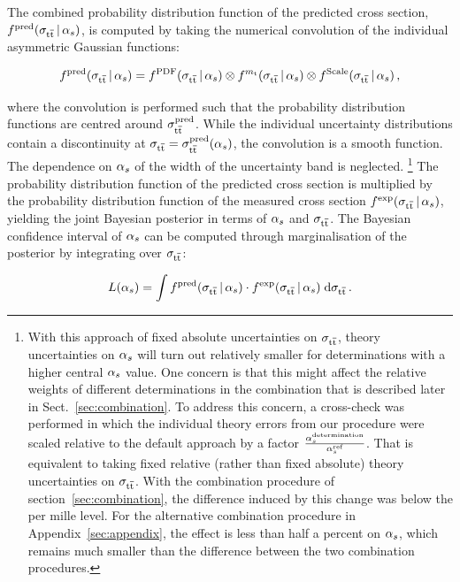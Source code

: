 The combined probability distribution function of the predicted cross
section, $f^{\text{pred}}(\sigma_{\mathrm{t}\overline{\mathrm{t}}}\,|\,\alpha_s)$, is computed by taking the
numerical convolution of the individual asymmetric Gaussian functions:
% 
\begin{linenomath*}
\begin{equation}
f^{\text{pred}}(\sigma_{\mathrm{t}\overline{\mathrm{t}}}\,|\,\alpha_s) = 
    f^{\text{PDF}}(\sigma_{\mathrm{t}\overline{\mathrm{t}}}\,|\,\alpha_s)    \otimes
    f^{m_{\mathrm{t}}}(\sigma_{\mathrm{t}\overline{\mathrm{t}}}\,|\,\alpha_s)           \otimes
    f^{\text{Scale}}(\sigma_{\mathrm{t}\overline{\mathrm{t}}}\,|\,\alpha_s)\,,
\end{equation}
\end{linenomath*}
% 
where the convolution is performed such that the probability distribution
functions are centred around $\sigma_{\mathrm{t}\overline{\mathrm{t}}}^\text{pred}$.
%
While the individual uncertainty distributions contain a discontinuity
at $\sigma_{\mathrm{t}\overline{\mathrm{t}}} = \sigma_{\mathrm{t}\overline{\mathrm{t}}}^{\text{pred}}(\alpha_s)$, the convolution is a smooth
function.
%
The dependence on $\alpha_s$ of the width of the uncertainty band is neglected.%
% 
\footnote{ With this approach of fixed absolute uncertainties on $\sigma_{\mathrm{t}\overline{\mathrm{t}}}$,
    theory uncertainties on $\alpha_s$ will turn out relatively smaller for
    determinations with a higher central $\alpha_s$ value.
    One concern is that this might affect the relative weights of
    different determinations in the combination that is described
    later in Sect.~\ref{sec:combination}.
    To address this concern, a cross-check was performed in which the
    individual theory errors from our procedure were scaled relative
    to the default approach by a factor
    $\frac{ \alpha_s^\text{determination} }{ \alpha_s^\text{ref} }$.
    That is equivalent to taking fixed relative (rather than fixed
    absolute) theory uncertainties on $\sigma_{\mathrm{t}\overline{\mathrm{t}}}$.
    With the combination procedure of section~\ref{sec:combination},
    the difference induced by this change was below the per mille
    level.
    For the alternative combination procedure in
    Appendix~\ref{sec:appendix}, the effect is less than half a 
    percent on $\alpha_s$, which remains much smaller than the difference
    between the two combination procedures.  }
%
The probability distribution function of the predicted cross section
is multiplied by the probability distribution function of the measured
cross section $f^{\text{exp}}(\sigma_{\mathrm{t}\overline{\mathrm{t}}}\,|\,\alpha_s)$, yielding the joint
Bayesian posterior in terms of $\alpha_s$ and $\sigma_{\mathrm{t}\overline{\mathrm{t}}}$. The Bayesian
confidence interval of $\alpha_s$ can be computed through marginalisation
of the posterior by integrating over $\sigma_{\mathrm{t}\overline{\mathrm{t}}}$:
%
\begin{linenomath*}
\begin{equation}
  \label{eq:likelihood-master-equation}
  L(\alpha_s) = \int f^{\text{pred}}(\sigma_{\mathrm{t}\overline{\mathrm{t}}}\,|\,\alpha_s) 
  \cdot 
  f^{\text{exp}}(\sigma_{\mathrm{t}\overline{\mathrm{t}}}\,|\,\alpha_s) \; \text{d}\sigma_{\mathrm{t}\overline{\mathrm{t}}}\,.
\end{equation}
\end{linenomath*}
